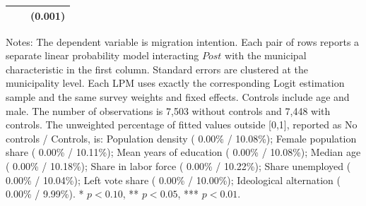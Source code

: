 \begin{table}[!htbp]
\begin{tabular}{llc}
 & & (0.001) \\
\hline
\end{tabular}
\par\vspace{1.5mm}
\begin{minipage}{\textwidth}
{\footnotesize Notes: The dependent variable is migration intention. Each pair of rows reports a separate linear probability model interacting \(Post\) with the municipal characteristic in the first column. Standard errors are clustered at the municipality level. Each LPM uses exactly the corresponding Logit estimation sample and the same survey weights and fixed effects. Controls include age and male. The number of observations is        7,503 without controls and        7,448 with controls. The unweighted percentage of fitted values outside [0,1], reported as No controls / Controls, is: Population density ( 0.00\% / 10.08\%); Female population share ( 0.00\% / 10.11\%); Mean years of education ( 0.00\% / 10.08\%); Median age ( 0.00\% / 10.18\%); Share in labor force ( 0.00\% / 10.22\%); Share unemployed ( 0.00\% / 10.04\%); Left vote share ( 0.00\% / 10.00\%); Ideological alternation ( 0.00\% /  9.99\%). * \(p<0.10\), ** \(p<0.05\), *** \(p<0.01\).}
\end{minipage}
\end{table}
